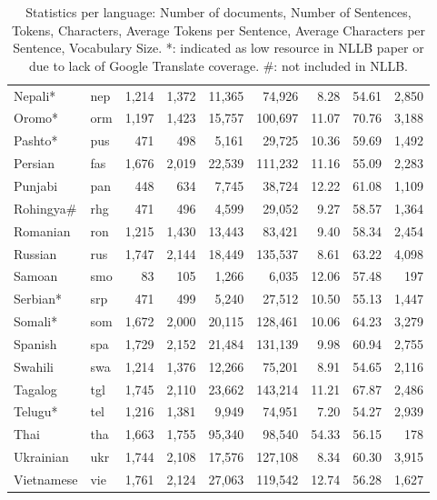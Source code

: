 \begin{table}[t]
\begin{tabular}{l l r r r r r r r}
Nepali* & nep & 1,214 & 1,372 & 11,365 & 74,926 & 8.28 & 54.61 & 2,850 \\
Oromo* & orm & 1,197 & 1,423 & 15,757 & 100,697 & 11.07 & 70.76 & 3,188 \\
Pashto* & pus & 471 & 498 & 5,161 & 29,725 & 10.36 & 59.69 & 1,492 \\
Persian & fas & 1,676 & 2,019 & 22,539 & 111,232 & 11.16 & 55.09 & 2,283 \\
Punjabi & pan & 448 & 634 & 7,745 & 38,724 & 12.22 & 61.08 & 1,109 \\
Rohingya\# & rhg & 471 & 496 & 4,599 & 29,052 & 9.27 & 58.57 & 1,364 \\
Romanian & ron & 1,215 & 1,430 & 13,443 & 83,421 & 9.40 & 58.34 & 2,454 \\
Russian & rus & 1,747 & 2,144 & 18,449 & 135,537 & 8.61 & 63.22 & 4,098 \\
Samoan & smo & 83 & 105 & 1,266 & 6,035 & 12.06 & 57.48 & 197 \\
Serbian* & srp & 471 & 499 & 5,240 & 27,512 & 10.50 & 55.13 & 1,447 \\
Somali* & som & 1,672 & 2,000 & 20,115 & 128,461 & 10.06 & 64.23 & 3,279 \\
Spanish & spa & 1,729 & 2,152 & 21,484 & 131,139 & 9.98 & 60.94 & 2,755 \\
Swahili & swa & 1,214 & 1,376 & 12,266 & 75,201 & 8.91 & 54.65 & 2,116 \\
Tagalog & tgl & 1,745 & 2,110 & 23,662 & 143,214 & 11.21 & 67.87 & 2,486 \\
Telugu* & tel & 1,216 & 1,381 & 9,949 & 74,951 & 7.20 & 54.27 & 2,939 \\
Thai & tha & 1,663 & 1,755 & 95,340 & 98,540 & 54.33 & 56.15 & 178 \\
Ukrainian & ukr & 1,744 & 2,108 & 17,576 & 127,108 & 8.34 & 60.30 & 3,915 \\
Vietnamese & vie & 1,761 & 2,124 & 27,063 & 119,542 & 12.74 & 56.28 & 1,627 \\
\bottomrule
\end{tabular}
\caption{Statistics per language: Number of documents, Number of Sentences, Tokens, Characters, Average Tokens per Sentence, Average Characters per Sentence, Vocabulary Size. *: indicated as low resource in NLLB paper or due to lack of Google Translate coverage. \#: not included in NLLB.}
\label{tab:combined_per_language_stats}
\end{table}
